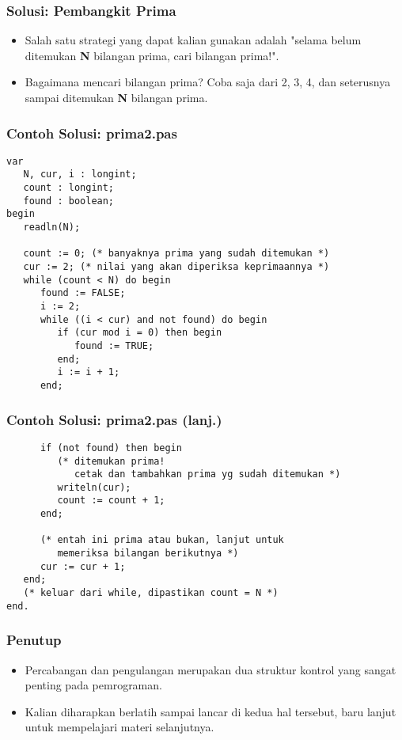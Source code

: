 \documentclass{beamer}
\begin{document}
\begin{frame}
\frametitle{Solusi: Pembangkit Prima}
\begin{itemize}
    \item Salah satu strategi yang dapat kalian gunakan adalah "selama belum ditemukan \textbf{N} bilangan prima, cari bilangan prima!".
    \item Bagaimana mencari bilangan prima? Coba saja dari 2, 3, 4, dan seterusnya sampai ditemukan \textbf{N} bilangan prima.
\end{itemize}
\end{frame}

\begin{frame}[fragile]
\frametitle{Contoh Solusi: prima2.pas}
\begin{lstlisting}
var
   N, cur, i : longint;
   count : longint;
   found : boolean;
begin
   readln(N);

   count := 0; (* banyaknya prima yang sudah ditemukan *)
   cur := 2; (* nilai yang akan diperiksa keprimaannya *)
   while (count < N) do begin
      found := FALSE;
      i := 2;
      while ((i < cur) and not found) do begin
         if (cur mod i = 0) then begin
            found := TRUE;
         end;
         i := i + 1;
      end;
\end{lstlisting}
\end{frame}

\begin{frame}[fragile]
\frametitle{Contoh Solusi: prima2.pas (lanj.)}
\begin{lstlisting}
      if (not found) then begin
         (* ditemukan prima!
            cetak dan tambahkan prima yg sudah ditemukan *)
         writeln(cur);
         count := count + 1;
      end;

      (* entah ini prima atau bukan, lanjut untuk
         memeriksa bilangan berikutnya *)
      cur := cur + 1;
   end;
   (* keluar dari while, dipastikan count = N *)
end.
\end{lstlisting}
\end{frame}

\begin{frame}
\frametitle{Penutup}
\begin{itemize}
    \item Percabangan dan pengulangan merupakan dua struktur kontrol yang sangat penting pada pemrograman.
    \item Kalian diharapkan berlatih sampai lancar di kedua hal tersebut, baru lanjut untuk mempelajari materi selanjutnya.
\end{itemize}
\end{frame}
\end{document}
